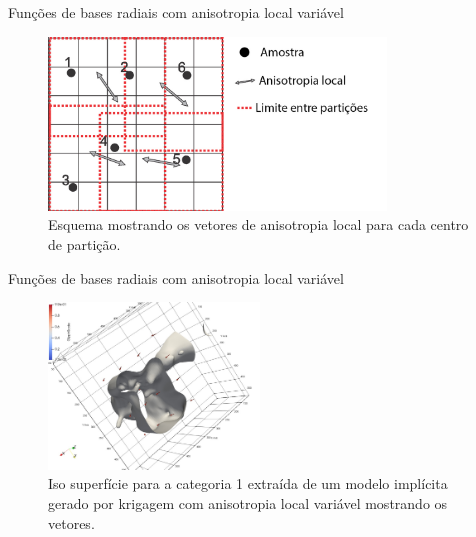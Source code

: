 \documentclass[aspectratio=169]{beamer}
\begin{document}
\begin{frame}{Funções de bases radiais com anisotropia local variável}
	\begin{figure}[H]
		\caption{\label{lva_rbf+cartoon} Esquema mostrando os vetores de anisotropia local para cada centro de partição.}
		\begin{center}
			\includegraphics[width=0.8\textwidth]{capitulo_2/lvarbf1.jpg}
		\end{center}
	\end{figure}
\end{frame}

\begin{frame}{Funções de bases radiais com anisotropia local variável}
	\begin{figure}[H]
		\caption{\label{rbf_iterref}Iso superfície para a categoria 1 extraída de um modelo implícita gerado por krigagem com anisotropia local variável mostrando os vetores.}
		\begin{center}
			\includegraphics[width=0.5\textwidth]{capitulo_2/rbf_iterref.jpeg}
		\end{center}
	\end{figure}
\end{frame}
\end{document}
